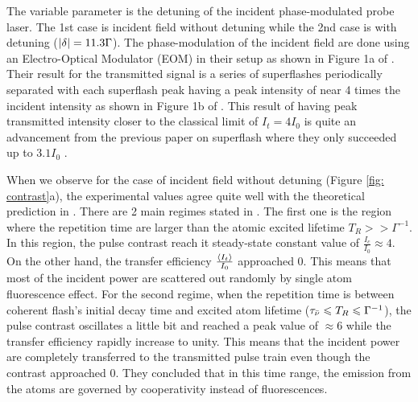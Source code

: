 The variable parameter is the detuning of the incident phase-modulated probe laser. The 1st case is incident field without detuning while the 2nd case is with detuning ($\abs{\delta} = 11.3 \Gamma$). The phase-modulation of the incident field are done using an Electro-Optical Modulator (EOM) in their setup as shown in Figure 1a of . Their result for the transmitted signal is a series of superflashes periodically separated with each superflash peak having a peak intensity of near 4 times the incident intensity as shown in Figure 1b of . This result of having peak transmitted intensity closer to the classical limit of $I_{t} = 4 I_{0}$ is quite an advancement from the previous paper on superflash where they only succeeded up to $3.1 I_{0}$ \cite{Kwong2014}.

When we observe for the case of incident field without detuning (Figure \ref{fig: contrast}a), the experimental values agree quite well with the theoretical prediction in . There are 2 main regimes stated in . The first one is the region where the repetition time are larger than the atomic excited lifetime $T_{R} >> \Gamma^{-1}$. In this region, the pulse contrast reach it steady-state constant value of $\frac{I_{c}}{I_{0}} \approx 4$. On the other hand, the transfer efficiency $\frac{\expval{I_{t}}}{I_{0}}$ approached 0. This means that most of the incident power are scattered out randomly by single atom fluorescence effect. For the second regime, when the repetition time is between coherent flash's initial decay time and excited atom lifetime ($\tau_{\Bar{\nu}} \leqslant T_{R} \leqslant \Gamma^{-1}$), the pulse contrast oscillates a little bit and reached a peak value of $\approx 6$ while the transfer efficiency rapidly increase to unity. This means that the incident power are completely transferred to the transmitted pulse train even though the contrast approached 0. They concluded that in this time range, the emission from the atoms are governed by cooperativity instead of fluorescences.

